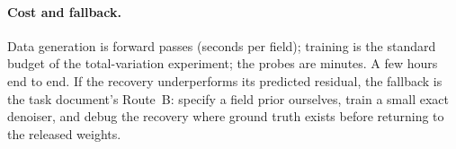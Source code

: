 \documentclass[11pt]{article}
\begin{document}
\paragraph{Cost and fallback.} Data generation is forward passes (seconds per field); training is the standard budget of the total-variation experiment; the probes are minutes. A few hours end to end. If the recovery underperforms its predicted residual, the fallback is the task document's Route~B: specify a field prior ourselves, train a small exact denoiser, and debug the recovery where ground truth exists before returning to the released weights.
\end{document}
